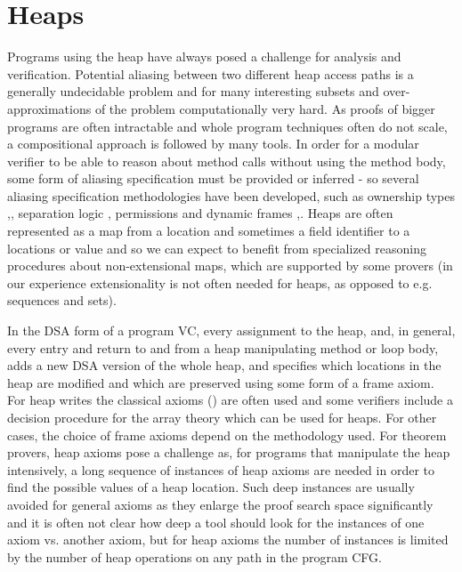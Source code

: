 \section{Heaps}
	Programs using the heap have always posed a challenge for analysis and verification.
	Potential aliasing between two different heap access paths is a generally undecidable problem and for many interesting subsets and over-approximations of the problem computationally very hard.
	As proofs of bigger programs are often intractable and whole program techniques often do not scale, a compositional approach is followed by many tools.
	In order for a modular verifier to be able to reason about method calls without using the method body, some form of aliasing specification must be provided or inferred - so several aliasing specification methodologies have been developed, such as ownership types \cite{DBLP:conf/ecoop/ClarkeNP01},\cite{DBLP:books/sp/Muller02}, separation logic \cite{DBLP:conf/lics/Reynolds02}, permissions \cite{DBLP:conf/sas/Boyland03} and dynamic frames \cite{DBLP:conf/fm/Kassios06},\cite{DBLP:conf/lpar/Leino10}.
Heaps are often represented as a map from a location and sometimes a field identifier to a locations or value and so we can expect to benefit from specialized reasoning procedures about non-extensional maps, which are supported by some provers (in our experience extensionality is not often needed for heaps, as opposed to e.g. sequences and sets).

	In the DSA form of a program VC, every assignment to the heap, and, in general, every entry and return to and from a heap manipulating method or loop body, adds a new DSA version of the whole heap, and specifies which locations in the heap are modified and which are preserved using some form of a frame axiom. For heap writes the classical axioms (\cite{Mccarthy62towardsa}) are often used and some verifiers include a decision procedure for the array theory which can be used for heaps. For other cases, the choice of frame axioms depend on the methodology used.
	For theorem provers, heap axioms pose a challenge as, for programs that manipulate the heap intensively, a long sequence of instances of heap axioms are needed in order to find the possible values of a heap location. 
	Such deep instances are usually avoided for general axioms as they enlarge the proof search space significantly and it is often not clear how deep a tool should look for the instances of one axiom vs. another axiom, but for heap axioms the number of instances is limited by the number of heap operations on any path in the program CFG.
	

